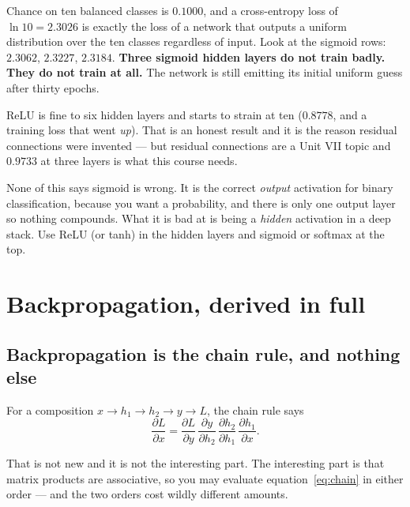\documentclass[11pt]{article}
\begin{document}
Chance on ten balanced classes is $0.1000$, and a cross-entropy loss of
$\ln 10 = 2.3026$ is exactly the loss of a network that outputs a uniform
distribution over the ten classes regardless of input. Look at the sigmoid
rows: $2.3062$, $2.3227$, $2.3184$. \textbf{Three sigmoid hidden layers do
not train badly. They do not train at all.} The network is still emitting its
initial uniform guess after thirty epochs.

ReLU is fine to six hidden layers and starts to strain at ten
($0.8778$, and a training loss that went \emph{up}). That is an honest
result and it is the reason residual connections were invented --- but
residual connections are a Unit VII topic and $0.9733$ at three layers is
what this course needs.

\begin{caution}
None of this says sigmoid is wrong. It is the correct \emph{output} activation
for binary classification, because you want a probability, and there is only
one output layer so nothing compounds. What it is bad at is being a
\emph{hidden} activation in a deep stack. Use ReLU (or tanh) in the hidden
layers and sigmoid or softmax at the top.
\end{caution}

\section{Backpropagation, derived in full}
\label{sec:bp}

\subsection{Backpropagation is the chain rule, and nothing else}

For a composition $x \to h_1 \to h_2 \to y \to L$, the chain rule says
\begin{equation}
  \frac{\partial L}{\partial x}
  = \frac{\partial L}{\partial y}\,
    \frac{\partial y}{\partial h_2}\,
    \frac{\partial h_2}{\partial h_1}\,
    \frac{\partial h_1}{\partial x}.
  \label{eq:chain}
\end{equation}

That is not new and it is not the interesting part. The interesting part is
that matrix products are associative, so you may evaluate
equation~\eqref{eq:chain} in either order --- and the two orders cost wildly
different amounts.
\end{document}
